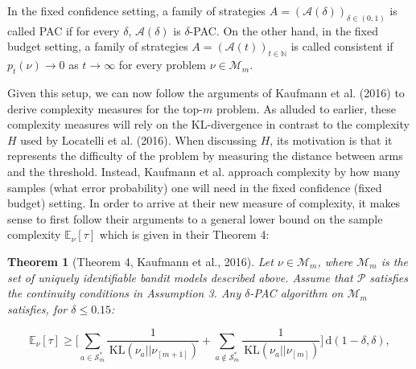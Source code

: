 \documentclass[11pt,]{article}
\newtheorem{theorem}{Theorem}
\newcommand{\KL}{\,\text{KL}}
\newcommand{\der}{\,\text{d}}
\begin{document}
In the fixed confidence setting, a family of strategies
\(A = (\mathcal{A}(\delta))_{\delta \in (0,1)}\) is called PAC if for
every \(\delta\), \(\mathcal{A}(\delta)\) is \(\delta\)-PAC. On the
other hand, in the fixed budget setting, a family of strategies
\(A = (\mathcal{A}(t))_{t \in \mathbb{N}}\) is called consistent if
\(p_t(\nu) \rightarrow 0\) as \(t \rightarrow \infty\) for every problem
\(\nu \in \mathcal{M}_m\).

Given this setup, we can now follow the arguments of Kaufmann et al.
(2016) to derive complexity measures for the top-\(m\) problem. As
alluded to earlier, these complexity measures will rely on the
KL-divergence in contrast to the complexity \(H\) used by Locatelli et
al. (2016). When discussing \(H\), its motivation is that it represents
the difficulty of the problem by measuring the distance between arms and
the threshold. Instead, Kaufmann et al. approach complexity by how many
samples (what error probability) one will need in the fixed confidence
(fixed budget) setting. In order to arrive at their new measure of
complexity, it makes sense to first follow their arguments to a general
lower bound on the sample complexity \(\mathbb{E}_{\nu}[\tau]\) which is
given in their Theorem 4:

\begin{theorem}[Theorem 4, Kaufmann et al., 2016] \label{theorem:KaufmannEtAlTheorem4}
Let $\nu \in \mathcal{M}_m$, where $\mathcal{M}_m$ is the set of uniquely identifiable bandit models described above. Assume that $\mathcal{P}$ satisfies the continuity conditions in Assumption 3. Any $\delta$-PAC algorithm on $\mathcal{M}_m$ satisfies, for $\delta \leq 0.15$:

\begin{equation*}
\mathbb{E}_{\nu}[\tau] \geq \Big[ \sum_{a \in \mathcal{S}^*_m} \frac{1}{\KL(\nu_a || \nu_{[m+1]})} + \sum_{a \notin \mathcal{S}^*_m} \frac{1}{\KL(\nu_a || \nu_{[m]})} \Big] \der(1-\delta, \delta),
\end{equation*}
\end{theorem}
\end{document}
